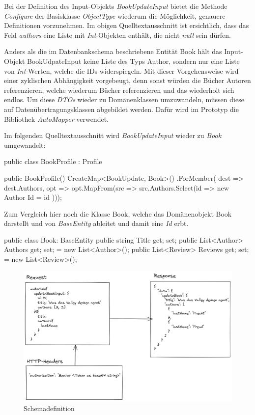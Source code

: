 Bei der Definition des Input-Objekts \textit{BookUpdateInput} bietet die Methode \textit{Configure} der Basisklasse \textit{ObjectType} wiederum die Möglichkeit, genauere Definitionen vorzunehmen.
Im obigen Quelltextausschnitt ist ersichtlich, dass das Feld \textit{authors} eine Liste mit \textit{Int}-Objekten enthält, die nicht \textit{null} sein dürfen.
\newline

Anders als die im Datenbankschema beschriebene Entität Book hält das Input-Objekt BookUdpateInput keine Liste des Typs Author, sondern nur eine Liste von \textit{Int}-Werten, welche die IDs widerspiegeln.
Mit dieser Vorgehensweise wird einer zyklischen Abhängigkeit vorgebeugt, denn sonst würden die Bücher Autoren referenzieren, welche wiederum Bücher referenzieren und das wiederholt sich endlos.
Um diese \textit{DTOs} wieder zu Domänenklassen umzuwandeln, müssen diese auf Datenübertragungsklassen abgebildet werden.
Dafür wird im Prototyp die Bibliothek \textit{AutoMapper} verwendet.

Im folgenden Quelltextausschnitt wird \textit{BookUpdateInput} wieder zu \textit{Book} umgewandelt:
\begin{JsCode}
public class BookProfile : Profile {
    public BookProfile() {
        CreateMap<BookUpdate, Book>()
            .ForMember(
            dest => dest.Authors,
            opt => opt.MapFrom(src => src.Authors.Select(id => new Author { Id = id })));
    }

}
\end{JsCode}

Zum Vergleich hier noch die Klasse Book, welche das Domänenobjekt Book darstellt und von \textit{BaseEntity} ableitet und damit eine \textit{Id} erbt.

\begin{JsCode}
public class Book: BaseEntity {
    public string Title { get; set; }
    public List<Author> Authors { get; set; } = new List<Author>();
    public List<Review> Reviews { get; set; } = new List<Review>();
}
\end{JsCode}
\pagebreak
{}

\begin{figure}[H]
    \includegraphics[width=\textwidth]{pics/execution_mutation.png}
    \caption{Schemadefinition}
\end{figure}

